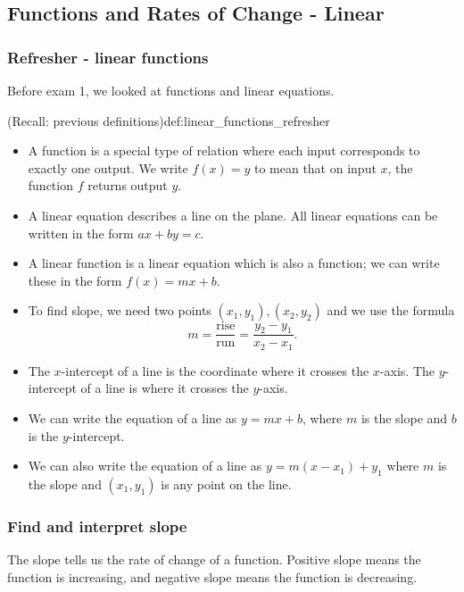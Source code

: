 \documentclass{article}
\begin{document}
\setcounter{section}{1}
\setcounter{subsection}{3}

\subsection{Functions and Rates of Change - Linear}

\subsubsection{Refresher - linear functions}

Before exam 1, we looked at functions and linear equations. 
\begin{definition}{(Recall: previous definitions)}{def:linear_functions_refresher}
    \begin{itemize}
        \item A function is a special type of relation where each input corresponds to exactly one output. We write $f(x)=y$ to mean that on input $x$, the function $f$ returns output $y$.
        \item A linear equation describes a line on the plane. All linear equations can be written in the form $ax+by=c$.
        \item A linear function is a linear equation which is also a function; we can write these in the form $f(x)=mx+b$.
        \item To find slope, we need two points $(x_1,y_1),(x_2,y_2)$ and we use the formula \[m=\frac{\text{rise}}{\text{run}}=\frac{y_2-y_1}{x_2-x_1}.\]    
        \item The $x$-intercept of a line is the coordinate where it crosses the $x$-axis. The $y$-intercept of a line is where it crosses the $y$-axis.
        \item We can write the equation of a line as $y=mx+b$, where $m$ is the slope and $b$ is the $y$-intercept.
        \item We can also write the equation of a line as $y=m(x-x_1)+y_1$ where $m$ is the slope and $(x_1,y_1)$ is any point on the line.
    \end{itemize}
\end{definition}

\subsubsection{Find and interpret slope}

The slope tells us the rate of change of a function. Positive slope means the function is increasing, and negative slope means the function is decreasing.
\end{document}
